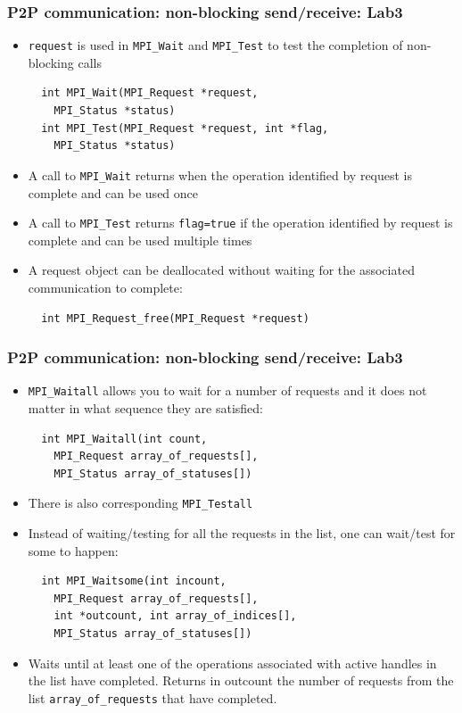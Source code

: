\documentclass{beamer}
\begin{document}
\begin{frame}[fragile]
  \frametitle{P2P communication: non-blocking send/receive: Lab3}
\begin{itemize}
\item {\color{mycolorcode}\verb|request|} is used in {\color{mycolorcode}\verb|MPI_Wait|} and {\color{mycolorcode}\verb|MPI_Test|} to test the completion of non-blocking calls
{\color{mycolorcode}
\begin{verbatim}
  int MPI_Wait(MPI_Request *request, 
    MPI_Status *status)
  int MPI_Test(MPI_Request *request, int *flag, 
    MPI_Status *status)
\end{verbatim}
}
\item A call to {\color{mycolorcode}\verb|MPI_Wait|} returns when the operation identified by request is complete and can be used once
\item A call to {\color{mycolorcode}\verb|MPI_Test|} returns \verb|flag=true| if the operation identified by request is complete and can be used multiple times
\item A request object can be deallocated without waiting for the associated communication
to complete: 
{\color{mycolorcode}
\begin{verbatim}
  int MPI_Request_free(MPI_Request *request)
\end{verbatim}
}
\end{itemize}
\end{frame}

\begin{frame}[fragile]
  \frametitle{P2P communication: non-blocking send/receive: Lab3}
\begin{itemize}
\item {\color{mycolorcode}\verb|MPI_Waitall|} allows you to wait for a number of requests and it does not matter in what sequence they are satisfied:
{\color{mycolorcode}
\begin{verbatim}
  int MPI_Waitall(int count, 
    MPI_Request array_of_requests[],
    MPI_Status array_of_statuses[])
\end{verbatim}
}
\item There is also corresponding {\color{mycolorcode}\verb|MPI_Testall|}
\item Instead of waiting/testing for all the requests in the list, one can wait/test for some to happen:
{\color{mycolorcode}
\begin{verbatim}
  int MPI_Waitsome(int incount, 
    MPI_Request array_of_requests[],
    int *outcount, int array_of_indices[],
    MPI_Status array_of_statuses[])
\end{verbatim}
}
\item Waits until at least one of the operations associated with active handles in the list have
completed. Returns in outcount the number of requests from the list {\color{mycolorcode}\verb|array_of_requests|} that
have completed.
\end{itemize}
\end{frame}
\end{document}
